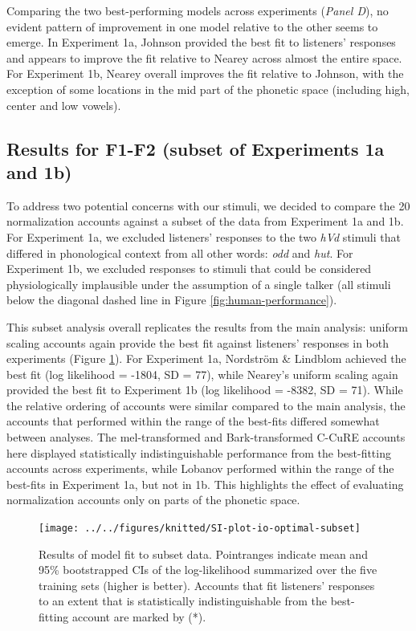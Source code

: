 \documentclass[preprint]{JASA}
\begin{document}
Comparing the two best-performing models across experiments (\emph{Panel D}), no evident pattern of improvement in one model relative to the other seems to emerge. In Experiment 1a, Johnson provided the best fit to listeners' responses and appears to improve the fit relative to Nearey across almost the entire space. For Experiment 1b, Nearey overall improves the fit relative to Johnson, with the exception of some locations in the mid part of the phonetic space (including high, center and low vowels).

\subsection{Results for F1-F2 (subset of Experiments 1a and 1b)}\label{sec:SI-overall-subset}

To address two potential concerns with our stimuli, we decided to compare the 20 normalization accounts against a subset of the data from Experiment 1a and 1b. For Experiment 1a, we excluded listeners' responses to the two \emph{hVd} stimuli that differed in phonological context from all other words: \emph{odd} and \emph{hut}. For Experiment 1b, we excluded responses to stimuli that could be considered physiologically implausible under the assumption of a single talker (all stimuli below the diagonal dashed line in Figure \ref{fig:human-performance}).

This subset analysis overall replicates the results from the main analysis: uniform scaling accounts again provide the best fit against listeners' responses in both experiments (Figure \ref{fig:SI-plot-io-optimal-subset}). For Experiment 1a, Nordström \& Lindblom achieved the best fit (log likelihood = -1804, SD = 77), while Nearey's uniform scaling again provided the best fit to Experiment 1b (log likelihood = -8382, SD = 71). While the relative ordering of accounts were similar compared to the main analysis, the accounts that performed within the range of the best-fits differed somewhat between analyses. The mel-transformed and Bark-transformed C-CuRE accounts here displayed statistically indistinguishable performance from the best-fitting accounts across experiments, while Lobanov performed within the range of the best-fits in Experiment 1a, but not in 1b. This highlights the effect of evaluating normalization accounts only on parts of the phonetic space.



\begin{figure}

{\centering \texttt{[image: ../../figures/knitted/SI-plot-io-optimal-subset]} 

}

\caption{Results of model fit to subset data. Pointranges indicate mean and 95\% bootstrapped CIs of the log-likelihood summarized over the five training sets (higher is better). Accounts that fit listeners' responses to an extent that is statistically indistinguishable from the best-fitting account are marked by (*).}\label{fig:SI-plot-io-optimal-subset}
\end{figure}
\end{document}

